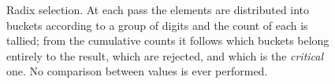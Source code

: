 \begin{figure}[H]
    \caption[Radix selection]{Radix selection. At each pass the elements are distributed into
    buckets according to a group of digits and the count of each is tallied;
    from the cumulative counts it follows which buckets belong entirely to the
    result, which are rejected, and which is the \emph{critical} one. No
    comparison between values is ever performed.}
    \label{fig:bg-radix}
\end{figure}
